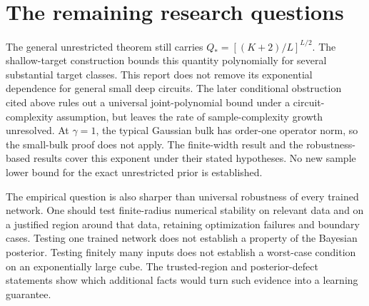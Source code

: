 \documentclass[11pt]{article}
\begin{document}























\section{The remaining research questions}

The general unrestricted theorem still carries
$Q_*=[(K+2)/L]^{L/2}$. The shallow-target construction bounds this
quantity polynomially for several substantial target classes. This report does not remove
its exponential dependence for general small deep circuits. The later
conditional obstruction cited above rules out a universal joint-polynomial
bound under a circuit-complexity assumption, but leaves the rate of
sample-complexity growth unresolved.
At $\gamma=1$, the typical Gaussian bulk has order-one operator norm,
so the small-bulk proof does not apply. The finite-width result and the
robustness-based results cover this exponent under their stated hypotheses.
No new sample lower bound for the exact unrestricted prior is established.

The empirical question is also sharper than universal robustness of every
trained network. One should test finite-radius numerical stability on
relevant data and on a justified region around that data, retaining
optimization failures and boundary cases. Testing one trained network
does not establish a property of the Bayesian posterior. Testing finitely
many inputs does not establish a worst-case condition on an exponentially
large cube. The trusted-region and posterior-defect statements show which
additional facts would turn such evidence into a learning guarantee.
\end{document}
